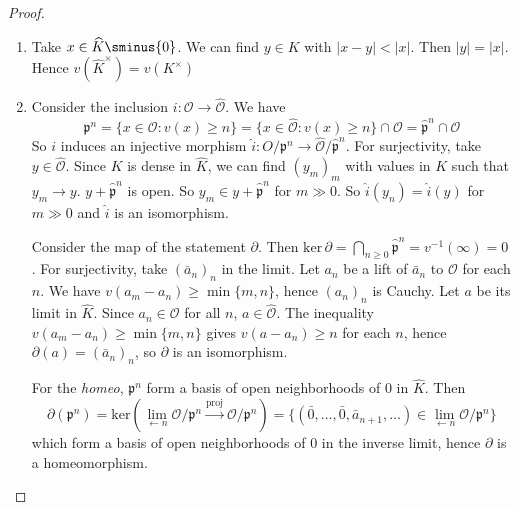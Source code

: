 \begin{proof}{}
\begin{enumerate}[label = \arabic*.]
    \item Take \(x \in \widehat{K} \sminus \{0\} \). We can find \(y \in K\)
        with \(|x-y| < |x|\). Then \(|y| = |x|\). Hence \(v {\left(
        \widehat{K}^{\times } \right)} = v {\left( K^{\times } \right)}  \) 
    \item Consider the inclusion \(i : \mathcal{O} \to \widehat{\mathcal{O}}\).
        We have 
        \[
            \mathfrak{p}^{n} = \{x \in \mathcal{O} : v{(x)} \ge n\} = \{x \in
            \widehat{\mathcal{O}} : v{(x)} \ge n\} \cap \mathcal{O} =
            \widehat{\mathfrak{p}}^{n} \cap \mathcal{O}
        \]
        So \(i\) induces an injective morphism \(\widehat{i} : O /
        \mathfrak{p}^{n} \to \widehat{\mathcal{O}} /
        \widehat{\mathfrak{p}}^{n}\). For surjectivity, take \(y \in
        \widehat{\mathcal{O}}\). Since \(K\) is dense in \(\widehat{K}\), we can
        find \({(y_{m})}_m\) with values in \(K\) such that \(y_{m}\to y\).
        \(y + \widehat{\mathfrak{p}}^{n}\) is open. So \(y_{m} \in y +
        \widehat{\mathfrak{p}}^{n}\) for \(m \gg 0\). So \(\widehat{i}{(y_{n})}
        = \widehat{i}{(y)}\) for \(m \gg 0\) and \(\widehat{i}\) is an
        isomorphism.

        Consider the map of the statement \(\partial\). Then \(\mathrm{ker}\,
        \partial = \bigcap_{n \ge 0} \widehat{\mathfrak{p}}^{n} =
        v^{-1}{(\infty)} = 0\). For surjectivity, take \({(\bar{a}_n)}_n\)
        in the limit. Let \(a_{n}\) be a lift of \(\bar{a}_n\) to
        \(\mathcal{O}\) for each \(n\).
        We have \(v{(a_{m} - a_{n})} \ge \min \{m, n\} \), hence \({(a_{n})}_n\)
        is Cauchy. Let \(a\) be its limit in \(\widehat{K}\). Since \(a_{n} \in
        \mathcal{O}\) for all \(n\), \(a \in \widehat{\mathcal{O}}\).
        The inequality \(v{(a_{m} - a_{n})} \ge \min \{m,n\} \) gives \(v{(a -
        a_{n})} \ge n\) for each \(n\), hence \(\partial{(a)} =
        {(\bar{a}_n)}_n\), so \(\partial\) is an isomorphism.

        For the \emph{homeo}, \(\mathfrak{p}^{n}\) form a basis of open
        neighborhoods of \(0\) in \(\widehat{K}\). Then
        \[
          \partial {\left( \mathfrak{p}^{n} \right)} = \mathrm{ker} {\left(
          \lim_{\longleftarrow n} \mathcal{O} / \mathfrak{p}^{n}
  \overset{\text{proj}}{\to} \mathcal{O} / \mathfrak{p}^{n}  \right)} =
  \{{(\bar{0}, \dots, \bar{0}, \bar{a}_{n+1} , \dots)} \in
  \lim_{\longleftarrow n} \mathcal{O} / \mathfrak{p}^{n}\} 
        \]
        which form a basis of open neighborhoods of 0 in the inverse limit,
        hence \(\partial\) is a homeomorphism.


\end{enumerate}
\end{proof}
